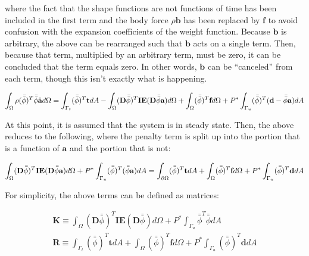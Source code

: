 \documentclass[10pt]{article}
\begin{document}
where the fact that the shape functions are not functions of time has been included in the first term and the body force \(\rho\textbf{b}\) has been replaced by \(\textbf{f}\) to avoid confusion with the expansion coefficients of the weight function. Because \(\textbf{b}\) is arbitrary, the above can be rearranged such that \(\textbf{b}\) acts on a single term. Then, because that term, multiplied by an arbitrary term, must be zero, it can be concluded that the term equals zero. In other words, \(\textbf{b}\) can be ``canceled'' from each term, though this isn't exactly what is happening.

\begin{equation}
\int_{\Omega}\rho(\bar{\bar{\phi}})^T\bar{\bar{\phi}}\ddot{\textbf{a}}d\Omega=\int_{\Gamma_t}(\bar{\bar{\phi}})^T\textbf{t}dA- \int_{\Omega}(\textbf{D}\bar{\bar{\phi}})^T\textbf{IE}(\textbf{D}\bar{\bar{\phi}}\textbf{a})d\Omega +\int_{\Omega}(\bar{\bar{\phi}})^T\textbf{f}d\Omega+P^{*}\int_{\Gamma_u}(\bar{\bar{\phi}})^T(\textbf{d}-\bar{\bar{\phi}}\textbf{a})dA\\
\end{equation}

At this point, it is assumed that the system is in steady state. Then, the above reduces to the following, where the penalty term is split up into the portion that is a function of \(\textbf{a}\) and the portion that is not:

\begin{equation}
\int_{\Omega}(\textbf{D}\bar{\bar{\phi}})^T\textbf{IE}(\textbf{D}\bar{\bar{\phi}}\textbf{a})d\Omega +P^{*}\int_{\Gamma_u}(\bar{\bar{\phi}})^T(\bar{\bar{\phi}}\textbf{a})dA=\int_{\partial\Omega}(\bar{\bar{\phi}})^T\textbf{t}dA+\int_{\Omega}(\bar{\bar{\phi}})^T\textbf{f}d\Omega+P^{*}\int_{\Gamma_u}(\bar{\bar{\phi}})^T\textbf{d}dA\\
\end{equation}

For simplicity, the above terms can be defined as matrices:

\begin{equation}
\label{eq:FEWeakForm}
\begin{aligned}
\textbf{K}\equiv\int_{\Omega}(\textbf{D}\bar{\bar{\phi}})^T\textbf{IE}(\textbf{D}\bar{\bar{\phi}})d\Omega +P^{*}\int_{\Gamma_u}\bar{\bar{\phi}}^T\bar{\bar{\phi}}dA\\
\textbf{R}\equiv\int_{\Gamma_t}(\bar{\bar{\phi}})^T\textbf{t}dA+\int_{\Omega}(\bar{\bar{\phi}})^T\textbf{f}d\Omega+P^{*}\int_{\Gamma_u}(\bar{\bar{\phi}})^T\textbf{d}dA\\
\end{aligned}
\end{equation}
\end{document}
